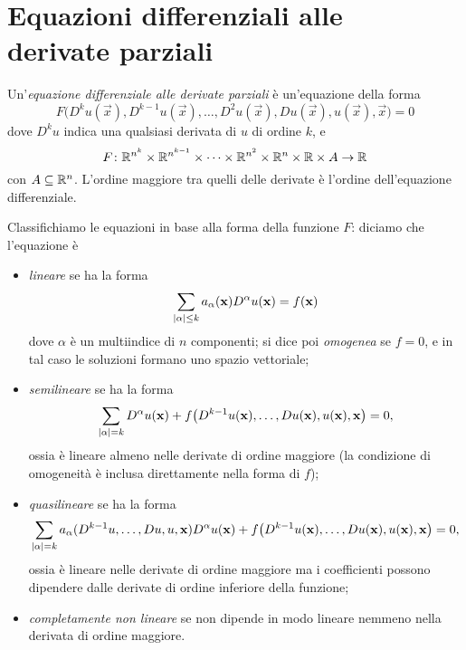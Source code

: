 \chapter[Equazioni differenziali alle derivate parziali]{Equazioni differenziali alle\\derivate parziali}

\begin{definizione} \label{d:pde}
    Un'\emph{equazione differenziale alle derivate parziali} è un'equazione della forma
    \begin{equation}
        F\bigl(D^k u(\vec x),D^{k-1}u(\vec x),\dotsc,D^2u(\vec x),Du(\vec x),u(\vec x),\vec x\bigr)=0
        \label{eq:pde-generica}
    \end{equation}
    dove $D^ku$ indica una qualsiasi derivata di $u$ di ordine $k$, e
    \begin{equation*}
        F\colon\mathbb{R}^{n^k}\times\mathbb{R}^{n^{k-1}}\times\dotsb\times\mathbb{R}^{n^2}\times\mathbb{R}^n\times\mathbb{R}\times A\to\mathbb{R}
    \end{equation*}
    con $A\subseteq\mathbb{R}^n$.
    L'ordine maggiore tra quelli delle derivate è l'ordine dell'equazione differenziale.
\end{definizione}
Classifichiamo le equazioni in base alla forma della funzione $F$: diciamo che l'equazione è
\begin{itemize}
    \item \emph{lineare} se ha la forma
        \begin{equation}
            \sum_{\lvert\alpha\rvert\le k}a_\alpha(\mathbf{x})D^\alpha u(\mathbf{x})=f(\mathbf{x})
            \label{eq:pde-lineare}
        \end{equation}
        dove $\alpha$ è un multiindice di $n$ componenti; si dice poi \emph{omogenea} se $f=0$, e in tal caso le soluzioni formano uno spazio vettoriale;
    \item \emph{semilineare} se ha la forma
        \begin{equation}
            \sum_{\lvert\alpha\rvert=k}D^\alpha u(\mathbf{x})+f\bigl(D^{k-1}u(\mathbf{x}),\dotsc,Du(\mathbf{x}),u(\mathbf{x}),\mathbf{x}\bigr)=0,
            \label{eq:pde-semilineare}
        \end{equation}
        ossia è lineare almeno nelle derivate di ordine maggiore (la condizione di omogeneità è inclusa direttamente nella forma di $f$);
    \item \emph{quasilineare} se ha la forma
        \begin{equation}
            \sum_{\lvert\alpha\rvert=k}a_\alpha(D^{k-1}u,\dotsc,Du,u,\mathbf{x})D^\alpha u(\mathbf{x})+f\bigl(D^{k-1}u(\mathbf{x}),\dotsc,Du(\mathbf{x}),u(\mathbf{x}),\mathbf{x}\bigr)=0,
            \label{eq:pde-quasilineare}
        \end{equation}
        ossia è lineare nelle derivate di ordine maggiore ma i coefficienti possono dipendere dalle derivate di ordine inferiore della funzione;
    \item \emph{completamente non lineare} se non dipende in modo lineare nemmeno nella derivata di ordine maggiore.
\end{itemize}

